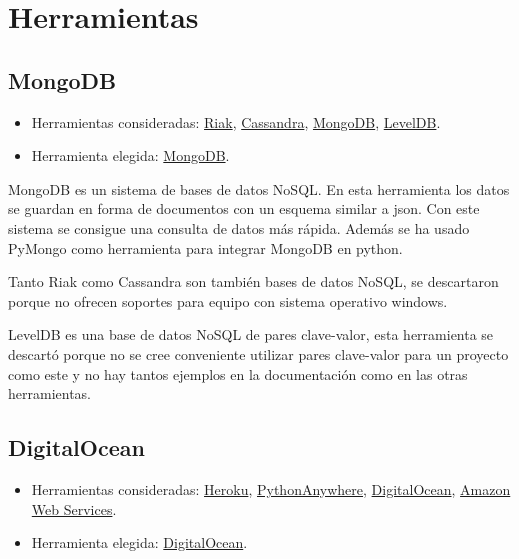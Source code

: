 
\section{Herramientas}

\subsection{MongoDB}

\begin{itemize}
	\tightlist
	\item
	Herramientas consideradas:
	\href{http://basho.com/riak/}{Riak}, 
	\href{http://cassandra.apache.org/}{Cassandra},
	\href{https://www.mongodb.com/}{MongoDB}, 
	\href{http://leveldb.org/}{LevelDB}.
	\item
	Herramienta elegida:
	\href{https://www.mongodb.com/}{MongoDB}.
\end{itemize}

MongoDB \cite{misc:mongodb} es un sistema de bases de datos NoSQL. En esta herramienta los datos se guardan en forma de documentos con un esquema similar a json. Con este sistema se consigue una consulta de datos más rápida. Además se ha usado PyMongo \cite{docs:pymongo} como herramienta para integrar MongoDB en python.

Tanto Riak como Cassandra son también bases de datos NoSQL, se descartaron porque no ofrecen soportes para equipo con sistema operativo windows. 

LevelDB es una base de datos NoSQL de pares clave-valor, esta herramienta se descartó porque no se cree conveniente utilizar pares clave-valor para un proyecto como este y no hay tantos ejemplos en la documentación como en las otras herramientas.

\subsection{DigitalOcean}

\begin{itemize}
	\tightlist
	\item
	Herramientas consideradas:
	\href{https://www.heroku.com/}{Heroku}, 
	\href{https://www.pythonanywhere.com/}{PythonAnywhere},
	\href{https://www.digitalocean.com/}{DigitalOcean}, 
	\href{https://aws.amazon.com/es/}{Amazon Web Services}.
	\item
	Herramienta elegida:
	\href{https://www.digitalocean.com/}{DigitalOcean}.
\end{itemize}

